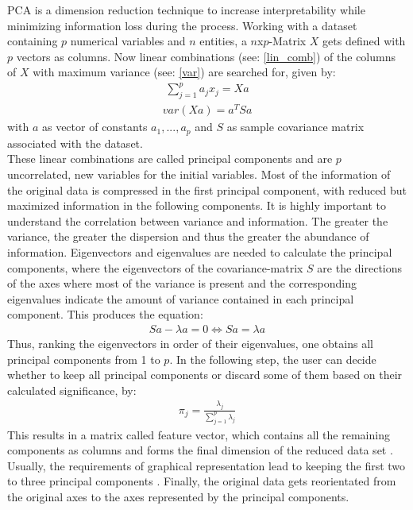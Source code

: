 PCA is a dimension reduction technique to increase interpretability while minimizing information loss during the process. Working with a dataset containing $p$ numerical variables and $n$ entities, a $n$x$p$-Matrix $X$ gets defined with $p$ vectors as columns. Now linear combinations (see: \ref{lin_comb}) of the columns of $X$ with maximum variance (see: \ref{var}) are searched for, given by: 
\begin{align}\label{lin_comb}
    \sum_{j=1}^{p}a_jx_j = Xa
\end{align}
\begin{align}\label{var}
    var(Xa) = a^TSa
\end{align}
with $a$ as vector of constants $a_1,...,a_p$ and $S$ as sample covariance matrix associated with the dataset. \cite{pca_beg}\\
These linear combinations are called principal components and are $p$ uncorrelated, new variables for the initial variables. Most of the information of the original data is compressed in the first principal component, with reduced but maximized information in the following components. It is highly important to understand the correlation between variance and information. The greater the variance, the greater the dispersion and thus the greater the abundance of information. Eigenvectors and eigenvalues are needed to calculate the principal components, where the eigenvectors of the covariance-matrix $S$ are the directions of the axes where most of the variance is present and the corresponding eigenvalues indicate the amount of variance contained in each principal component. \cite{pca_step} This produces the equation: \cite{pca_beg}
\begin{align}
    Sa - \lambda a = 0 \Leftrightarrow Sa = \lambda a
\end{align}
Thus, ranking the eigenvectors in order of their eigenvalues, one obtains all principal components from 1 to $p$. In the following step, the user can decide whether to keep all principal components or discard some of them based on their calculated significance, by: \cite{pca_beg}
\begin{align}
    \pi_j = \frac{\lambda_j}{\sum_{j=1}^{p}\lambda_j}
\end{align}
This results in a matrix called feature vector, which contains all the remaining components as columns and forms the final dimension of the reduced data set \cite{pca_step}. Usually, the requirements of graphical representation lead to keeping the first two to three principal components \cite{pca_beg}. Finally, the original data gets reorientated from the original axes to the axes represented by the principal components.